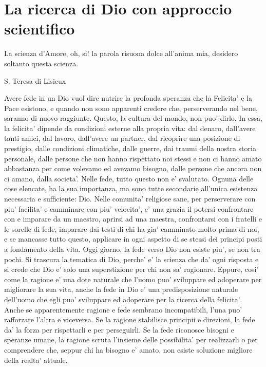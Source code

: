 \chapter{La ricerca di Dio con approccio scientifico}
\label{chapterDio}

\epigraph{
     La scienza d'Amore, oh, si! la parola risuona dolce all'anima mia, desidero soltanto questa scienza.
 }{S. Teresa di Lisieux}

Avere fede in un Dio vuol dire nutrire la profonda speranza che la Felicita' e la Pace esistono, e quando non sono apparenti credere che, perserverando nel bene, saranno di nuovo raggiunte. Questo, la cultura del mondo, non puo' dirlo. In essa, la felicita' dipende da condizioni esterne alla propria vita: dal denaro, dall'avere tanti amici, dal lavoro, dall'avere un partner, dal ricoprire una posizione di prestigio, dalle condizioni climatiche, dalle guerre, dai traumi della nostra storia personale, dalle persone che non hanno rispettato noi stessi e non ci hanno amato abbastanza per come volevamo ed avevamo bisogno, dalle persone che ancora non ci amano, dalla societa'. Nelle fede, tutto questo non e' svalutato. Ognuna delle cose elencate, ha la sua importanza, ma sono tutte secondarie all'unica esistenza necessaria e sufficiente: Dio.
Nelle comunita' religiose sane, per perserverare con piu' facilita' e camminare con piu' velocita', e' una grazia il potersi confrontare con e imparare da un maestro, aprirsi ad una maestra, confrontarsi con i fratelli e le sorelle di fede, imparare dai testi di chi ha gia' camminato molto prima di noi, e se mancasse tutto questo, applicare in ogni aspetto di se stessi dei principi posti a fondamento della vita.
Oggi giorno, la fede verso Dio non esiste piu', se non tra pochi. Si trascura la tematica di Dio, perche' e' la scienza che da' ogni risposta e si crede che Dio e' solo una superstizione per chi non sa' ragionare. Eppure, cosi' come la ragione e' una dote naturale che l'uomo puo' sviluppare ed adoperare per migliorare la sua vita, anche la fede in Dio e' una predisposizione naturale dell'uomo che egli puo' sviluppare ed adoperare per la ricerca della felicita'. Anche se apparentemente ragione e fede sembrano incompatibili, l'una puo' rafforzare l'altra e viceversa. Se la ragione stabilisce principii e direzioni, la fede da' la forza per rispettarli e per perseguirli. Se la fede riconosce bisogni e speranze umane, la ragione scruta l'insieme delle possibilita' per realizzarli o per comprendere che, seppur chi ha bisogno e' amato, non esiste soluzione migliore della realta' attuale.

